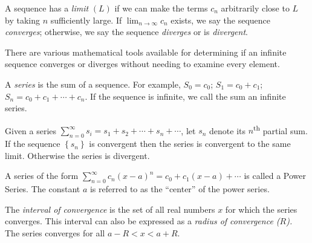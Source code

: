 \begin{definition}
A sequence has a \emph{limit} $(L)$ if we can make the terms $c_n$ arbitrarily close to $L$ by taking $n$ sufficiently large.  If $\lim_{n\to \infty} c_n$ exists, we say the sequence \emph{converges}; otherwise, we say the sequence \emph{diverges} or is \emph{divergent}.
\end{definition}

There are various mathematical tools available for determining if an infinite sequence converges or diverges without needing to examine every element.

\begin{definition}
A \emph{series} is the sum of a sequence. For example, $S_0 = c_0$; $S_1 = c_0+c_1$; $S_n = c_0+c_1+\cdots+c_n$.  If the sequence is infinite, we call the sum an infinite series.
\end{definition}

\begin{definition}
Given a series $\sum_{n=0}^{\infty}s_i=s_1+s_2+\cdots+s_n+\cdots$, let $s_n$ denote its $n$\textsuperscript{th} partial sum.  If the sequence $\left\{s_n \right\}$ is convergent then the series is convergent to the same limit.  Otherwise the series is divergent.
\end{definition}

\begin{definition}
A series of the form $\sum_{n=0}^{\infty}c_n(x-a)^n=c_0+c_1(x-a)+\cdots$ is called a Power Series. The constant $a$ is referred to as the ``center'' of the power series.
\end{definition}


\begin{definition}
The \emph{interval of convergence} is the set of all real numbers $x$ for which the series converges.  This interval can also be expressed as a \emph{radius of convergence ($R$).}  The series converges for all $a-R < x < a+R$.
\end{definition}

